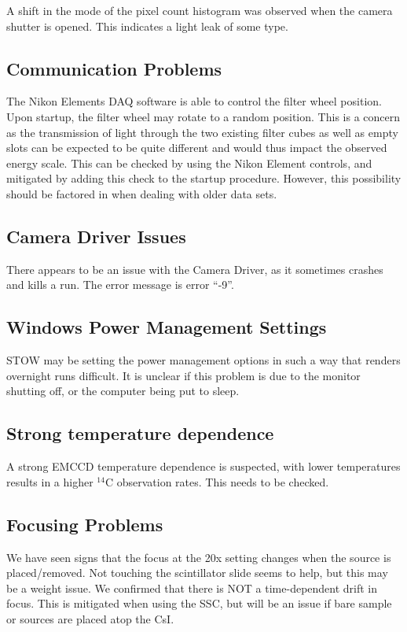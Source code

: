 \documentclass[11pt]{article}
\newcommand{\nuc}[2]{\ensuremath{^{#1}}#2}
\begin{document}
A shift in the mode of the pixel count histogram was observed when the camera shutter is opened. This indicates a light leak of some type. 

\subsection{Communication Problems}
The Nikon Elements DAQ software is able to control the filter wheel position. Upon startup, the filter wheel may rotate to a random position. This is a concern as the transmission of 
light through the two existing filter cubes as well as empty slots can be expected to be quite different and would thus impact the observed energy scale.
This can be checked by using the Nikon Element controls, and mitigated by adding this check to the startup procedure. However, this possibility should be factored in
when dealing with older data sets. 


\subsection{Camera Driver Issues}
There appears to be an issue with the Camera Driver, as it sometimes crashes and kills a run. The error message is error ``-9''.

\subsection{Windows Power Management Settings}
STOW may be setting the power management options in such a way that renders overnight runs difficult. It is unclear if this problem is due to the monitor shutting off, or the computer being put to sleep.


\subsection{Strong temperature dependence}
A strong EMCCD temperature dependence is suspected, with lower temperatures results in a higher \nuc{14}{C} observation rates. This needs to be checked. 

\subsection{Focusing Problems}
We have seen signs that the focus at the 20x setting changes when the source is placed/removed. Not touching the scintillator slide seems to help, but this may be a weight issue.
We confirmed that there is NOT a time-dependent drift in focus. This is mitigated when using the SSC, but will be an issue if bare sample or sources are placed atop the CsI. 
\end{document}
